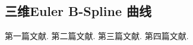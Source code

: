 \documentclass[utf8]{ctexart} %
\begin{document}
	 \subsection{三维Euler B-Spline 曲线}
		
		
		\renewcommand\refname{参考文献}
		\begin{thebibliography}{100}%
				第一篇文献.
				第二篇文献.
				第三篇文献.
				第四篇文献.
		\end{thebibliography}  
\end{document}
